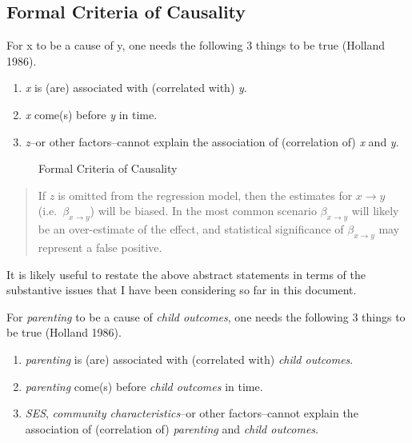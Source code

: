 \documentclass[
  letterpaper,
  DIV=11,
  numbers=noendperiod]{scrreprt}
\providecommand{\tightlist}{%
  \setlength{\itemsep}{0pt}\setlength{\parskip}{0pt}}\usepackage{longtable,booktabs,array}
\begin{document}
\hypertarget{formal-criteria-of-causality}{%
\subsection{Formal Criteria of
Causality}\label{formal-criteria-of-causality}}

For x to be a cause of y, one needs the following 3 things to be true
(Holland 1986).

\begin{enumerate}
\def\labelenumi{\arabic{enumi}.}
\tightlist
\item
  \emph{x} is (are) associated with (correlated with) \emph{y}.
\item
  \emph{x} come(s) before \emph{y} in time.
\item
  \emph{z}--or other factors--cannot explain the association of
  (correlation of) \emph{x} and \emph{y}.
\end{enumerate}

\begin{figure}

{\centering 

}

\caption{\label{fig-causality}Formal Criteria of Causality}

\end{figure}

\begin{quote}
If \emph{z} is omitted from the regression model, then the estimates for
\(x \rightarrow y\) (i.e.~\(\beta_{x \rightarrow y}\)) will be biased.
In the most common scenario \(\beta_{x \rightarrow y}\) will likely be
an over-estimate of the effect, and statistical significance of
\(\beta_{x \rightarrow y}\) may represent a false positive.
\end{quote}

It is likely useful to restate the above abstract statements in terms of
the substantive issues that I have been considering so far in this
document.

For \emph{parenting} to be a cause of \emph{child outcomes}, one needs
the following 3 things to be true (Holland 1986).

\begin{enumerate}
\def\labelenumi{\arabic{enumi}.}
\tightlist
\item
  \emph{parenting} is (are) associated with (correlated with)
  \emph{child outcomes}.
\item
  \emph{parenting} come(s) before \emph{child outcomes} in time.
\item
  \emph{SES}, \emph{community characteristics}--or other factors--cannot
  explain the association of (correlation of) \emph{parenting} and
  \emph{child outcomes}.
\end{enumerate}
\end{document}
